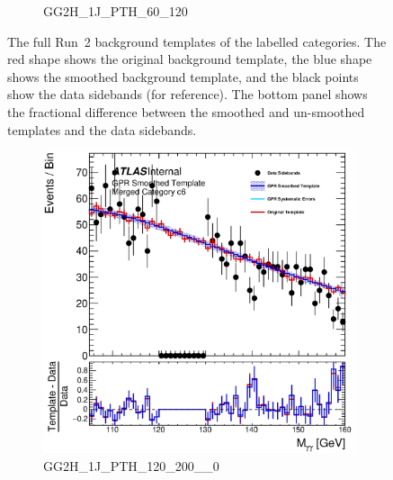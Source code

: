 \begin{figure}
\begin{center}
\begin{subfigure}[T]{0.49\linewidth}
	\caption{GG2H\_1J\_PTH\_60\_120}
\end{subfigure}
\caption{The full Run~2 background templates of the labelled categories. The red shape shows the original background template, the blue shape shows the smoothed background template, and the black points show the data sidebands (for reference). The bottom panel shows the fractional difference between the smoothed and un-smoothed templates and the data sidebands.}
\label{fig:gpr_coupcat_1}
\end{center}
\end{figure}


\begin{figure} 
\begin{center}
\begin{subfigure}[T]{0.49\linewidth}
	\centering
	\includegraphics[width=\linewidth]{figures/background/gpr/coupCatTemplates/GPR_Smoothed_Plot_hmgg_c6.eps}
	\caption{GG2H\_1J\_PTH\_120\_200\_\_0}
\end{subfigure}
\begin{subfigure}[T]{0.49\linewidth}
	\centering

\end{subfigure}
\end{center}
\end{figure}
